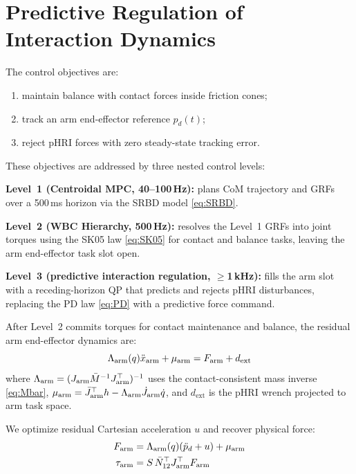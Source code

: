 \section{Predictive Regulation of Interaction Dynamics}\label{sec:impedancempc}

The control objectives are:
\begin{enumerate}
  \item maintain balance with contact forces inside friction cones;
  \item track an arm end-effector reference $p_d(t)$;
  \item reject pHRI forces with zero steady-state tracking error.
\end{enumerate}

These objectives are addressed by three nested control levels:

\textbf{Level~1 (Centroidal MPC, 40--100\,Hz):} plans CoM trajectory and
GRFs over a 500\,ms horizon via the SRBD model \eqref{eq:SRBD}.

\textbf{Level~2 (WBC Hierarchy, 500\,Hz):} resolves the Level~1 GRFs into
joint torques using the SK05 law \eqref{eq:SK05} for contact and balance
tasks, leaving the arm end-effector task slot open.

\textbf{Level~3 (predictive interaction regulation, $\geq$1\,kHz):} fills the arm slot with a
receding-horizon QP that predicts and rejects pHRI disturbances, replacing
the PD law \eqref{eq:PD} with a predictive force command.

After Level~2 commits torques for contact maintenance and balance, the
residual arm end-effector dynamics are:
\begin{equation}\label{eq:plant}
  \Lambda_{\text{arm}}(q)\ddot{x}_{\text{arm}}+\mu_{\text{arm}} = F_{\text{arm}}+d_{\text{ext}}
\end{equation}
where $\Lambda_{\text{arm}}=(J_{\text{arm}}\bar{M}^{-1} J_{\text{arm}}^\top)^{-1}$ uses the
contact-consistent mass inverse \eqref{eq:Mbar},
$\mu_{\text{arm}}=\bar{J}_{\text{arm}}^\top h - \Lambda_{\text{arm}}\dot{J}_{\text{arm}}\dot{q}$,
and $d_{\text{ext}}$ is the pHRI wrench projected to arm task space.

We optimize residual Cartesian acceleration $u$ and recover physical force:
\begin{subequations}\label{eq:feedforward}
\begin{align}
  F_{\text{arm}} &= \Lambda_{\text{arm}}(q)(\ddot{p}_d+u)+\mu_{\text{arm}} \label{eq:ff_a}\\
  \tau_{\text{arm}} &= S\,\bar{N}_{12}^\top J_{\text{arm}}^\top F_{\text{arm}} \label{eq:ff_b}
\end{align}
\end{subequations}

